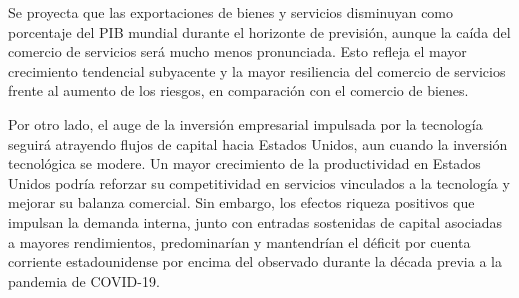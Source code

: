 \documentclass[10pt,a4paper]{article}
\begin{document}
Se proyecta que las exportaciones de bienes y servicios disminuyan como porcentaje del PIB mundial durante el horizonte de previsión, aunque la caída del comercio de servicios será mucho menos pronunciada. Esto refleja el mayor crecimiento tendencial subyacente y la mayor resiliencia del comercio de servicios frente al aumento de los riesgos, en comparación con el comercio de bienes.

Por otro lado, el auge de la inversión empresarial impulsada por la tecnología seguirá atrayendo flujos de capital hacia Estados Unidos, aun cuando la inversión tecnológica se modere. Un mayor crecimiento de la productividad en Estados Unidos podría reforzar su competitividad en servicios vinculados a la tecnología y mejorar su balanza comercial. Sin embargo, los efectos riqueza positivos que impulsan la demanda interna, junto con entradas sostenidas de capital asociadas a mayores rendimientos, predominarían y mantendrían el déficit por cuenta corriente estadounidense por encima del observado durante la década previa a la pandemia de COVID-19.
\end{document}
